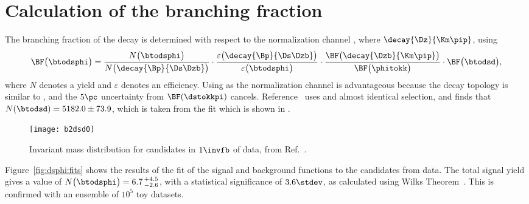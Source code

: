 \section{Calculation of the branching fraction}
\label{sec:dsphi:bf}
The branching fraction of the decay \btodsphi is determined with respect to the normalization
channel \btodsd, where $\decay{\Dz}{\Km\pip}$, using
\begin{equation}
  \BF\big(\btodsphi\big) =
  \frac{N\big(\btodsphi\big)}{N\big(\decay{\Bp}{\Ds\Dzb}\big)}
  \cdot
  \frac{\varepsilon\big(\decay{\Bp}{\Ds\Dzb}\big)}{\varepsilon\big(\btodsphi\big)}
  \cdot
  \frac{\BF\big(\decay{\Dzb}{\Km\pip}\big)}{\BF\big(\phitokk\big)}
  \cdot
  \BF\big(\btodsd\big)
  ,
  \label{eq:dsphi:bf}
\end{equation}
where $N$ denotes a yield and $\varepsilon$ denotes an efficiency.
Using \btodsd as the normalization channel is advantageous because the decay topology is similar to
\btodsphi, and the $5\pc$ uncertainty from $\BF(\dstokkpi)$ cancels.
Reference~\cite{LHCb-CONF-2012-009} uses and almost identical selection, and finds that
$N(\btodsd) = 5182.0\pm73.9$, which is taken from the fit which is shown in
.



\begin{figure}
  \begin{center}
    \texttt{[image: b2dsd0]}
    \caption[Fit to the normalization channel \btodsd]
    {
      Invariant mass distribution for \btodsd candidates in $1\invfb$ of \lhcb data, from
      Ref.~\protect\cite{LHCb-CONF-2012-009}.
    }
    \label{fig:dsphi:dsd}
  \end{center}
\end{figure}




Figure~\ref{fig:dsphi:fits} shows the results of the fit of the signal and background functions to
the \btodsphi candidates from data.
The total signal yield gives a value of $N\big(\btodsphi\big)=6.7\,^{+4.5}_{-2.6}$, with a
statistical significance of $3.6\stdev$, as calculated using Wilks Theorem~\cite{wilks1938}.
This is confirmed with an ensemble of $10^5$ toy datasets.

